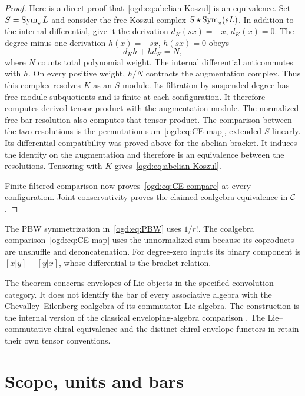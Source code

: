 \begin{proof}
Here is a direct proof that~\eqref{ogd:eq:abelian-Koszul} is an equivalence.
Set \(S=\operatorname{Sym}_\star L\) and consider the free Koszul complex
\(S\star\operatorname{Sym}_\star(sL)\).
In addition to the internal differential, give it the derivation \(d_K(sx)=-x\), \(d_K(x)=0\).
The degree-minus-one derivation \(h(x)=-sx\), \(h(sx)=0\) obeys
\[
 d_Kh+hd_K=N,
\]
where \(N\) counts total polynomial weight.
The internal differential anticommutes with \(h\).
On every positive weight, \(h/N\) contracts the augmentation complex.
Thus this complex resolves \(K\) as an \(S\)-module.
Its filtration by suspended degree has free-module subquotients and is finite at each configuration.
It therefore computes derived tensor product with the augmentation module.
The normalized free bar resolution also computes that tensor product.
The comparison between the two resolutions is the permutation sum~\eqref{ogd:eq:CE-map}, extended \(S\)-linearly.
Its differential compatibility was proved above for the abelian bracket.
It induces the identity on the augmentation and therefore is an equivalence between the resolutions.
Tensoring with \(K\) gives~\eqref{ogd:eq:abelian-Koszul}.

Finite filtered comparison now proves~\eqref{ogd:eq:CE-compare} at every configuration.
Joint conservativity proves the claimed coalgebra equivalence in \(\mathcal C\).
\end{proof}

The PBW symmetrization in~\eqref{ogd:eq:PBW} uses \(1/r!\).
The coalgebra comparison~\eqref{ogd:eq:CE-map} uses the unnormalized sum because its coproducts are unshuffle and deconcatenation.
For degree-zero inputs its binary component is \([x|y]-[y|x]\), whose differential is the bracket relation.

The theorem concerns envelopes of Lie objects in the specified convolution category.
It does not identify the bar of every associative algebra with the Chevalley--Eilenberg coalgebra of its commutator Lie algebra.
The construction is the internal version of the classical enveloping-algebra comparison \cite{ogd:CE}.
The Lie--commutative chiral equivalence and the distinct chiral envelope functors in  retain their own tensor conventions.

\section{Scope, units and bars}
\label{ogd:sec:status}

